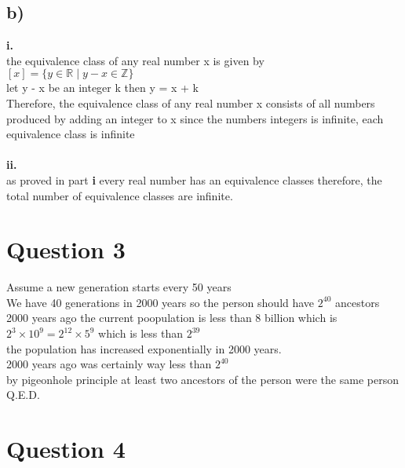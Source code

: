 \documentclass[11pt]{article}
\begin{document}
\subsection*{b)}
\textbf{i.} \\
the equivalence class of any real number x is given by \\
$[x] = \{y \in \mathbb{R} \;|\; y - x \in \mathbb{Z}\}$ \\
let y - x be an integer k then y = x + k \\
Therefore, the equivalence class of any real number x consists of all numbers
produced by adding an integer to x
since the numbers integers is infinite, each equivalence class is infinite
\\ \\
\textbf{ii.} \\
as proved in part \textbf{i} every real number has an equivalence classes therefore,
the total number of equivalence classes are infinite.

\section*{Question 3}
Assume a new generation starts every 50 years \\
We have 40 generations in 2000 years so the person should have $2^{40}$ ancestors 2000 years ago
the current poopulation is less than 8 billion which is $2^3 \times 10^9 = 2^{12} \times 5^9$
which is less than $2^{39}$ \\
the population has increased exponentially in 2000 years. \\
2000 years ago was certainly way less than $2^{40}$ \\
by pigeonhole principle at least two ancestors of the person were the
same person \\
Q.E.D.


\section*{Question 4}
\end{document}
